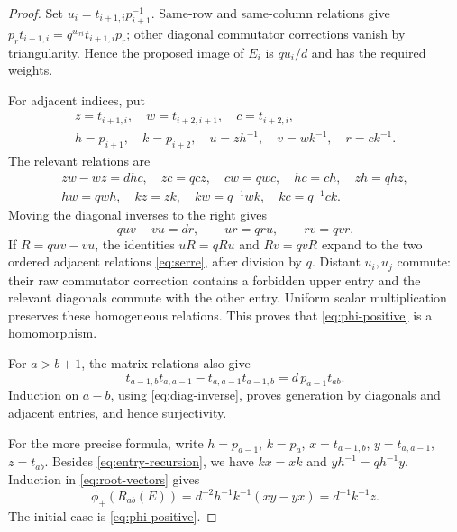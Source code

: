 \documentclass[11pt]{article}
\theoremstyle{definition}
\theoremstyle{remark}
\begin{document}
\begin{proof}
Set $u_i=t_{i+1,i}p_{i+1}^{-1}$. Same-row and same-column relations give
$p_rt_{i+1,i}=q^{w_{ri}}t_{i+1,i}p_r$; other diagonal commutator corrections vanish by triangularity. Hence the proposed image of $E_i$ is $qu_i/d$ and has the required weights.

For adjacent indices, put
\[
 \begin{gathered}
 z=t_{i+1,i},\quad w=t_{i+2,i+1},\quad c=t_{i+2,i},\\
 h=p_{i+1},\quad k=p_{i+2},\quad u=zh^{-1},\quad v=wk^{-1},\quad r=ck^{-1}.
 \end{gathered}
\]
The relevant relations are
\[
 \begin{gathered}
 zw-wz=dhc,\quad zc=qcz,\quad cw=qwc,\quad hc=ch,\quad zh=qhz,\\
 hw=qwh,\quad kz=zk,\quad kw=q^{-1}wk,\quad kc=q^{-1}ck.
 \end{gathered}
\]
Moving the diagonal inverses to the right gives
\[
 quv-vu=dr,\qquad ur=qru,\qquad rv=qvr.
\]
If $R=quv-vu$, the identities $uR=qRu$ and $Rv=qvR$ expand to the two ordered adjacent relations \eqref{eq:serre}, after division by $q$. Distant $u_i,u_j$ commute: their raw commutator correction contains a forbidden upper entry and the relevant diagonals commute with the other entry. Uniform scalar multiplication preserves these homogeneous relations. This proves that \eqref{eq:phi-positive} is a homomorphism.

For $a>b+1$, the matrix relations also give
\begin{equation}\label{eq:entry-recursion}
 t_{a-1,b}t_{a,a-1}-t_{a,a-1}t_{a-1,b}=d\,p_{a-1}t_{ab}.
\end{equation}
Induction on $a-b$, using \eqref{eq:diag-inverse}, proves generation by diagonals and adjacent entries, and hence surjectivity.

For the more precise formula, write $h=p_{a-1}$, $k=p_a$, $x=t_{a-1,b}$, $y=t_{a,a-1}$, $z=t_{ab}$. Besides \eqref{eq:entry-recursion}, we have $kx=xk$ and $yh^{-1}=qh^{-1}y$. Induction in \eqref{eq:root-vectors} gives
\[
 \phi_+(R_{ab}(E))=d^{-2}h^{-1}k^{-1}(xy-yx)=d^{-1}k^{-1}z.
\]
The initial case is \eqref{eq:phi-positive}.
\end{proof}
\end{document}

